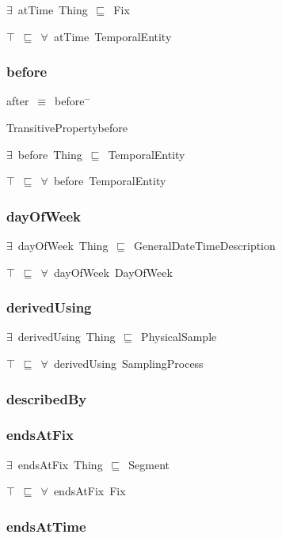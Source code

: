 \documentclass{article}
\begin{document}
\ensuremath{\exists}~atTime~Thing~\ensuremath{\sqsubseteq}~Fix

\ensuremath{\top}~\ensuremath{\sqsubseteq}~\ensuremath{\forall}~atTime~TemporalEntity

\subsubsection*{before}

after~\ensuremath{\equiv}~before\ensuremath{^-}

TransitivePropertybefore

\ensuremath{\exists}~before~Thing~\ensuremath{\sqsubseteq}~TemporalEntity

\ensuremath{\top}~\ensuremath{\sqsubseteq}~\ensuremath{\forall}~before~TemporalEntity

\subsubsection*{dayOfWeek}

\ensuremath{\exists}~dayOfWeek~Thing~\ensuremath{\sqsubseteq}~GeneralDateTimeDescription

\ensuremath{\top}~\ensuremath{\sqsubseteq}~\ensuremath{\forall}~dayOfWeek~DayOfWeek

\subsubsection*{derivedUsing}

\ensuremath{\exists}~derivedUsing~Thing~\ensuremath{\sqsubseteq}~PhysicalSample

\ensuremath{\top}~\ensuremath{\sqsubseteq}~\ensuremath{\forall}~derivedUsing~SamplingProcess

\subsubsection*{describedBy}

\subsubsection*{endsAtFix}

\ensuremath{\exists}~endsAtFix~Thing~\ensuremath{\sqsubseteq}~Segment

\ensuremath{\top}~\ensuremath{\sqsubseteq}~\ensuremath{\forall}~endsAtFix~Fix

\subsubsection*{endsAtTime}
\end{document}
